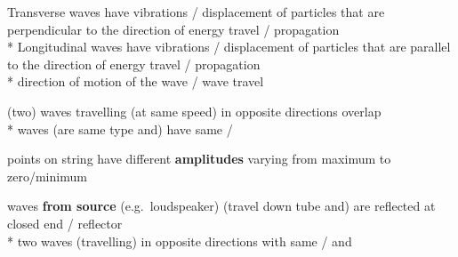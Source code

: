 \begin{question}%

  Transverse waves have vibrations / displacement of particles that are perpendicular to the direction of energy travel / propagation~\hfill{}\\*
  Longitudinal waves have vibrations / displacement of particles that are parallel to the direction of energy travel / propagation~\hfill{}\\*
  \NOT direction of motion of the wave / wave travel
\end{question}

\begin{question}%

  (two) waves travelling (at same speed) in opposite directions overlap~\hfill{}\\*
  waves (are same type and) have same /~\hfill{}
\end{question}

\begin{question}%

  points on string have different \textbf{amplitudes} varying from maximum to zero/minimum~\hfill{}
\end{question}

\begin{question}%

  waves \textbf{from source} (e.g.\ loudspeaker) (travel down tube and) are reflected at closed end / reflector~\hfill{}\\*
  two waves (travelling) in opposite directions with same / and  ~\hfill{}
\end{question}

